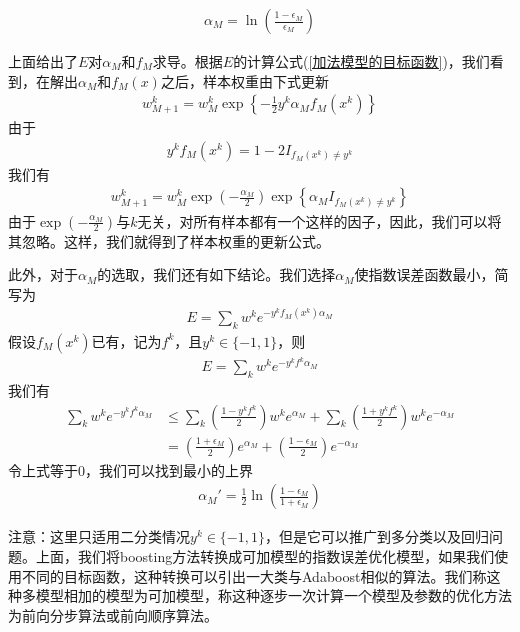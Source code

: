          \begin{align*}
          \alpha_M= \ln \left( \frac{1-\epsilon_M}{\epsilon_M} \right)
          \end{align*}
          \par
          上面给出了$E$对$\alpha_M$和$f_M$求导。根据$E$的计算公式(\ref{加法模型的目标函数})，我们看到，在解出$\alpha_M$和$f_M(x)$之后，样本权重由下式更新
          \begin{align*}
          w_{M+1}^k = w_M^k \exp\left\{-\frac{1}{2} y^k \alpha_M f_M(x^k)  \right\}
          \end{align*}
          由于
          \begin{align*}
          y^k f_M(x^k) = 1-2 I_{f_M(x^k)\neq y^k}
          \end{align*}
          我们有
          \begin{align*}
          w_{M+1}^k = w_M^k\exp \left(- \frac{\alpha_M}{2} \right) \exp\left\{\alpha_M I_{f_M(x^k) \neq y^k}\right\}
          \end{align*}
          由于$\exp (- \frac{\alpha_M}{2} )$与$k$无关，对所有样本都有一个这样的因子，因此，我们可以将其忽略。这样，我们就得到了样本权重的更新公式。
          \par
          此外，对于$\alpha_M$的选取，我们还有如下结论。我们选择$\alpha_M$使指数误差函数最小，简写为
          \begin{align*}
          E = \sum_k w^k e^{-y^k f_M(x^k)\alpha_M}
          \end{align*}
          假设$f_M(x^k)$已有，记为$f^k$，且$y^k\in \{-1,1\}$，则
          \begin{align*}
          E = \sum_k w^k e^{-y^k f^k \alpha_M}
          \end{align*}
          我们有
          \begin{align*}
          \sum_k w^k e^{-y^k f^k \alpha_M} & \leqslant \sum_k \left( \frac{1-y^k f^k}{2} \right)w^k e^{\alpha_M} + \sum_k \left( \frac{1+y^k f^k}{2} \right) w^k e^{-\alpha_M} \\
          & = \left( \frac{1+\epsilon_M}{2} \right) e^{\alpha_M} + \left( \frac{1-\epsilon_M}{2} \right) e^{-\alpha_M}
          \end{align*}
          令上式等于0，我们可以找到最小的上界
          \begin{align*}
          \alpha_M' = \frac{1}{2}\ln \left( \frac{1-\epsilon_M}{1+\epsilon_M} \right)
          \end{align*}
          \par
          注意：这里只适用二分类情况$y^k\in \{-1,1\}$，但是它可以推广到多分类以及回归问题。上面，我们将boosting方法转换成可加模型的指数误差优化模型，如果我们使用不同的目标函数，这种转换可以引出一大类与Adaboost相似的算法。我们称这种多模型相加的模型为可加模型，称这种逐步一次计算一个模型及参数的优化方法为前向分步算法或前向顺序算法。

